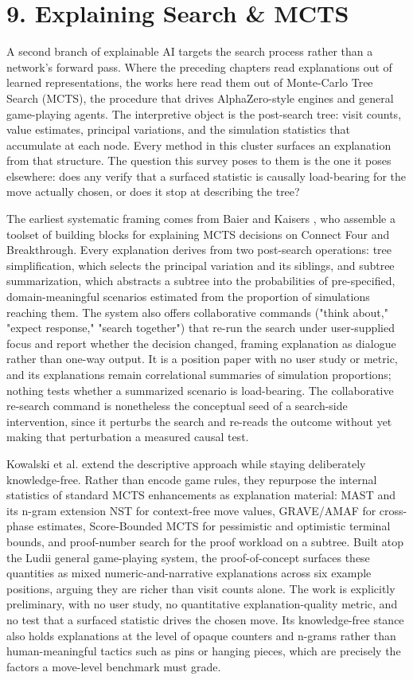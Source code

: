 \documentclass[conference]{IEEEtran}
\begin{document}
\section*{9. Explaining Search \& MCTS}
A second branch of explainable AI targets the search process rather than a network's forward pass. Where the preceding chapters read explanations out of learned representations, the works here read them out of Monte-Carlo Tree Search (MCTS), the procedure that drives AlphaZero-style engines and general game-playing agents. The interpretive object is the post-search tree: visit counts, value estimates, principal variations, and the simulation statistics that accumulate at each node. Every method in this cluster surfaces an explanation from that structure. The question this survey poses to them is the one it poses elsewhere: does any verify that a surfaced statistic is causally load-bearing for the move actually chosen, or does it stop at describing the tree?

The earliest systematic framing comes from Baier and Kaisers \cite{ref55}, who assemble a toolset of building blocks for explaining MCTS decisions on Connect Four and Breakthrough. Every explanation derives from two post-search operations: tree simplification, which selects the principal variation and its siblings, and subtree summarization, which abstracts a subtree into the probabilities of pre-specified, domain-meaningful scenarios estimated from the proportion of simulations reaching them. The system also offers collaborative commands ("think about," "expect response," "search together") that re-run the search under user-supplied focus and report whether the decision changed, framing explanation as dialogue rather than one-way output. It is a position paper with no user study or metric, and its explanations remain correlational summaries of simulation proportions; nothing tests whether a summarized scenario is load-bearing. The collaborative re-search command is nonetheless the conceptual seed of a search-side intervention, since it perturbs the search and re-reads the outcome without yet making that perturbation a measured causal test.

Kowalski et al. \cite{ref34} extend the descriptive approach while staying deliberately knowledge-free. Rather than encode game rules, they repurpose the internal statistics of standard MCTS enhancements as explanation material: MAST and its n-gram extension NST for context-free move values, GRAVE/AMAF for cross-phase estimates, Score-Bounded MCTS for pessimistic and optimistic terminal bounds, and proof-number search for the proof workload on a subtree. Built atop the Ludii general game-playing system, the proof-of-concept surfaces these quantities as mixed numeric-and-narrative explanations across six example positions, arguing they are richer than visit counts alone. The work is explicitly preliminary, with no user study, no quantitative explanation-quality metric, and no test that a surfaced statistic drives the chosen move. Its knowledge-free stance also holds explanations at the level of opaque counters and n-grams rather than human-meaningful tactics such as pins or hanging pieces, which are precisely the factors a move-level benchmark must grade.
\end{document}
